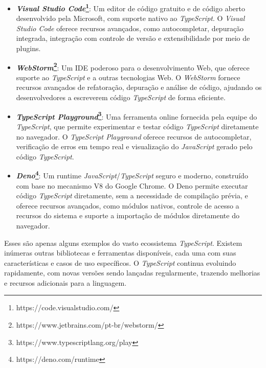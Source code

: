 \begin{itemize}
\item \textbf{\textit{Visual Studio Code}\footnote{ https://code.visualstudio.com/}}: Um editor de código gratuito e de código aberto desenvolvido pela Microsoft, com suporte nativo ao \textit{TypeScript}. O \textit{Visual Studio Code} oferece recursos avançados, como autocompletar, depuração integrada, integração com controle de versão e extensibilidade por meio de plugins.

\item \textbf{\textit{WebStorm}\footnote{ https://www.jetbrains.com/pt-br/webstorm/}}: Um IDE poderoso para o desenvolvimento Web, que oferece suporte ao \textit{TypeScript} e a outras tecnologias Web. O \textit{WebStorm} fornece recursos avançados de refatoração, depuração e análise de código, ajudando os desenvolvedores a escreverem código \textit{TypeScript} de forma eficiente.

\item \textbf{\textit{TypeScript Playground}\footnote{ https://www.typescriptlang.org/play}}: Uma ferramenta online fornecida pela equipe do \textit{TypeScript}, que permite experimentar e testar código \textit{TypeScript} diretamente no navegador. O \textit{TypeScript Playground} oferece recursos de autocompletar, verificação de erros em tempo real e visualização do \textit{JavaScript} gerado pelo código \textit{TypeScript}.


\item \textbf{\textit{Deno}\footnote{ https://deno.com/runtime}}: Um runtime \textit{JavaScript}/\textit{TypeScript} seguro e moderno, construído com base no mecanismo V8 do Google Chrome. O Deno permite executar código \textit{TypeScript} diretamente, sem a necessidade de compilação prévia, e oferece recursos avançados, como módulos nativos, controle de acesso a recursos do sistema e suporte a importação de módulos diretamente do navegador.
\end{itemize}

Esses são apenas alguns exemplos do vasto ecossistema \textit{TypeScript}. Existem inúmeras outras bibliotecas e ferramentas disponíveis, cada uma com suas características e casos de uso específicos. O \textit{TypeScript} continua evoluindo rapidamente, com novas versões sendo lançadas regularmente, trazendo melhorias e recursos adicionais para a linguagem.


